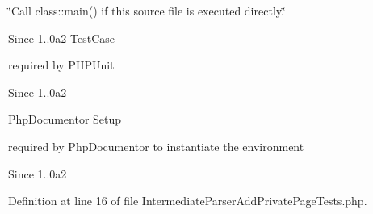\char`\"{}\-Call class\-::main() if this source file is executed directly.\char`\"{} \begin{DoxySince}{\-Since}
1..\-0a2 \-Test\-Case
\end{DoxySince}
required by \-P\-H\-P\-Unit \begin{DoxySince}{\-Since}
1..\-0a2
\end{DoxySince}
\-Php\-Documentor \-Setup

required by \-Php\-Documentor to instantiate the environment \begin{DoxySince}{\-Since}
1..\-0a2 
\end{DoxySince}


\-Definition at line 16 of file \-Intermediate\-Parser\-Add\-Private\-Page\-Tests.\-php.

